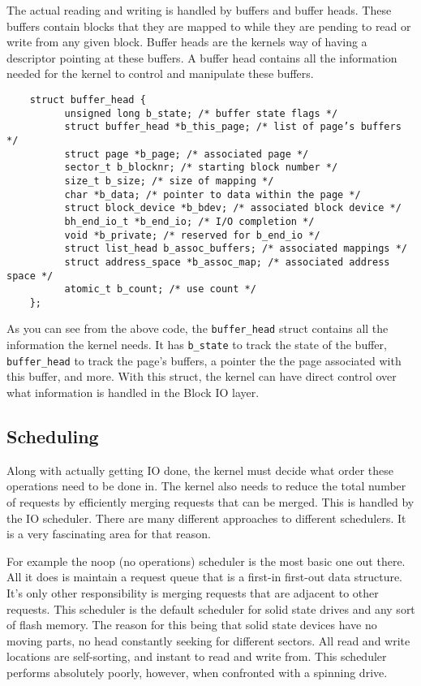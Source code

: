   The actual reading and writing is handled by buffers and buffer heads. These
  buffers contain blocks that they are mapped to while they are pending to read
  or write from any given block. Buffer heads are the kernels way of having a
  descriptor pointing at these buffers. A buffer head contains all the information
  needed for the kernel to control and manipulate these buffers. \cite{robertlove2010}

  \begin{lstlisting}
    struct buffer_head {
          unsigned long b_state; /* buffer state flags */
          struct buffer_head *b_this_page; /* list of page’s buffers */
          struct page *b_page; /* associated page */
          sector_t b_blocknr; /* starting block number */
          size_t b_size; /* size of mapping */
          char *b_data; /* pointer to data within the page */
          struct block_device *b_bdev; /* associated block device */
          bh_end_io_t *b_end_io; /* I/O completion */
          void *b_private; /* reserved for b_end_io */
          struct list_head b_assoc_buffers; /* associated mappings */
          struct address_space *b_assoc_map; /* associated address space */
          atomic_t b_count; /* use count */
    };
\end{lstlisting}
  As you can see from the above code, the \texttt{buffer\_head} struct contains
  all the information the kernel needs. It has \texttt{b\_state} to track the
  state of the buffer, \texttt{buffer\_head} to track the page's buffers,  a pointer
  the the page associated with this buffer, and more. With this struct, the kernel
  can have direct control over what information is handled in the Block IO layer.

  \subsection{Scheduling}
  Along with actually getting IO done, the kernel must decide what order these
  operations need to be done in. The kernel also needs to reduce the total
  number of requests by efficiently merging requests that can be merged. This is
  handled by the IO scheduler. There are many different approaches to different
  schedulers. It is a very fascinating area for that reason.

  For example the noop (no operations) scheduler is the most basic one out there.
  All it does is maintain a request queue that is a first-in first-out data structure. It's
  only other responsibility is merging requests that are adjacent to other requests.
  This scheduler is the default scheduler for solid state drives and any sort of
  flash memory. The reason for this being that solid state devices have no moving
  parts, no head constantly seeking for different sectors. All read and write locations
  are self-sorting, and instant to read and write from. This scheduler performs
  absolutely poorly, however, when confronted with a spinning drive.

